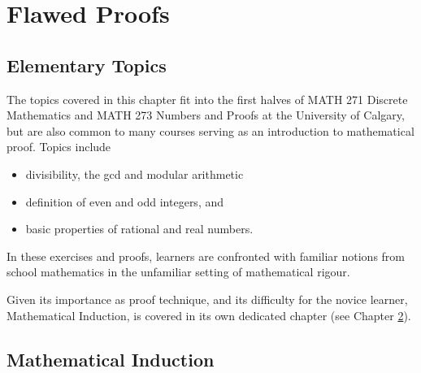 \documentclass[12pt]{book}
\begin{document}


\part{Flawed Proofs}\label{part-proofs}

\chapter{Elementary Topics}\label{ch-element}
The topics covered in this chapter fit into the first halves of MATH 271 Discrete Mathematics and MATH 273 Numbers and Proofs at the University of Calgary, but are also common to many courses serving as an introduction to mathematical proof.  Topics include
\begin{itemize}
 	\item divisibility, the gcd and modular arithmetic
 	\item definition of even and odd integers, and
 	\item basic properties of rational and real numbers.
\end{itemize}
In these exercises and proofs, learners are confronted with familiar notions from school mathematics in the unfamiliar setting of mathematical rigour.

Given its importance as proof technique, and its difficulty for the novice learner,
Mathematical Induction, is covered in its own dedicated chapter (see Chapter \ref{ch-ind}).



\chapter{Mathematical Induction}\label{ch-ind}
\end{document}

